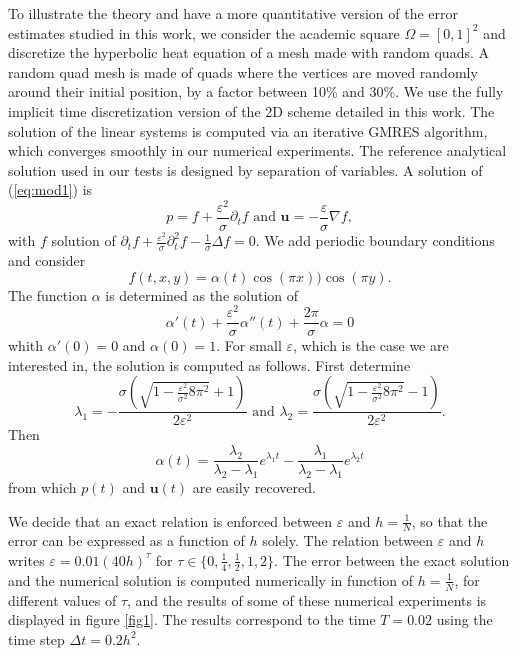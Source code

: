 \documentclass[a4paper,french,english,10pt]{article}
\newcommand\eps{\varepsilon}
\begin{document}
To illustrate the theory and have a more quantitative version of the error estimates
studied in this work, we consider the academic square $\Omega=[0,1]^2$ and discretize the hyperbolic heat equation
of a mesh made with random quads. 
A random quad mesh is made of quads where the vertices are moved
randomly around their initial position, by a factor between 10\% and 30\%.
We use the fully implicit time discretization version of the 2D scheme
detailed in this work. The solution of the linear systems is computed via
an iterative GMRES algorithm, which converges smoothly in our numerical experiments.
The reference analytical solution used in our tests is designed by separation of variables.
A solution of (\ref{eq:mod1}) is
$$
p= f+\frac{\eps^2}\sigma \partial_t f
\mbox{ and }
\mathbf u= -\frac\eps \sigma \nabla f,
$$
with $f$ solution of 
$
\partial_t f +\frac{\eps^2}\sigma \partial_t^2 f -\frac1\sigma \Delta f=0$.
We add periodic boundary conditions and consider
$$
f(t,x,y)=\alpha(t)\cos (\pi x ))\cos( \pi y ).
$$
The function $\alpha$ is determined as the solution of
$$
\alpha'(t)+ \frac{\eps^2}\sigma\alpha''(t)+\frac{2\pi}\sigma \alpha=0
$$
whith $\alpha'(0)=0$ and $\alpha(0)=1$.
For small $\eps$, which is the case we are interested in, the solution is computed as follows.
First determine 
$$
\lambda_1=-
\frac{
\sigma \left( \sqrt{1-\frac{\eps^2}{\sigma^2}  8 \pi^2  } +1\right)
}{2 \eps^2  }
\mbox{ and }
\lambda_2=
\frac{
\sigma \left( \sqrt{1-\frac{\eps^2}{\sigma^2}  8 \pi^2  } -1\right)
}{2 \eps^2  }.
$$
Then 
$$
\alpha(t)=\frac{\lambda_2}{\lambda_2-\lambda_1}e^{\lambda_1 t  }
-
\frac{\lambda_1}{\lambda_2-\lambda_1}e^{\lambda_2 t  }
$$
from which $p(t)$ and $\mathbf u(t)$ are easily recovered.

We decide that an exact relation is enforced between
$\eps$ and $h=\frac1N$, so that the error can be expressed as a function of $h$ solely.
The relation between $\eps$ and $h$ writes
$\eps=0.01 (40h)^\tau$ for $\tau \in\{0,\frac14, \frac12, 1, 2  \}$.
The error between the exact solution and the numerical solution is computed numerically
in function of $h=\frac1N$, for different values of $\tau$, and the results of some of these numerical experiments is
displayed in figure \ref{fig1}. The results correspond  to the  time $T = 0.02$ using the time step 
$\Delta t = 0.2 h^2$.
\end{document}
